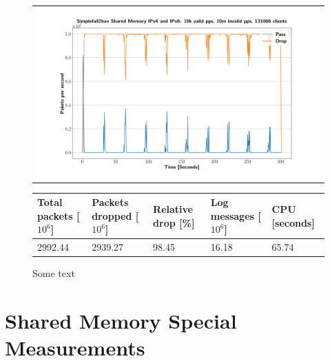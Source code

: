 \begin{figure}[p]
	\label{fig:simplefail2ban:shm:ip46:10m}
	\centering
	\scriptsize
	\begin{tabular}{c}
    	\centerline{\includegraphics[width=1.2\textwidth]{images/simplefail2ban_shm_ipv46_v10k_iv10m_c131068.png}}
	\end{tabular}
	\begin{tabular}{lllll}
		\toprule
		\textbf{Total packets [$10^6$]} & \textbf{Packets dropped [$10^6$]} & \textbf{Relative drop [\%]} & \textbf{Log messages [$10^6$]} & \textbf{CPU [seconds]} \\ \midrule 
		2992.44 & 2939.27 & 98.45 & 16.18 & 65.74 \\
		\bottomrule
	\end{tabular}
	\caption[Simplefail2ban Shared Memory IPv4 \& IPv6 10m PPS]{Some text}
\end{figure}

\section{Shared Memory Special Measurements}

